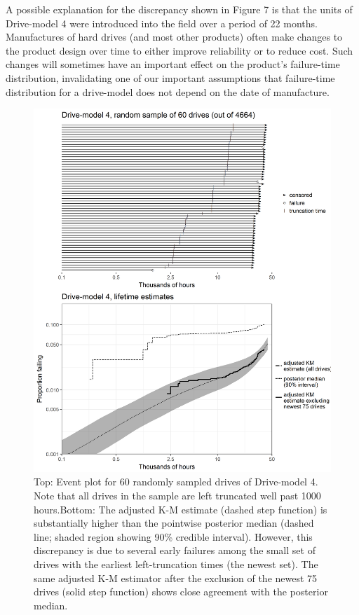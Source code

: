 \documentclass[12pt]{article}
\begin{document}
A possible explanation for the discrepancy shown in Figure 7 is that
the units of Drive-model 4 were introduced into the field over a
period of 22 months. Manufactures of hard drives (and most other
products) often make changes to the product design over time to
either improve reliability or to reduce cost. Such changes will
sometimes have an important effect on the product's failure-time
distribution, invalidating one of our important assumptions that
failure-time distribution for a drive-model does not depend on the
date of manufacture. 

\begin{figure}
\centering
\includegraphics[height=.8\textheight]{dm4-exception.png}
\caption{\footnotesize Top: Event plot for 60 randomly sampled drives of Drive-model 4. Note that all drives in the sample are left truncated well past 1000 hours.\hspace{\textwidth}Bottom: The adjusted K-M estimate (dashed step function) is substantially higher than the pointwise posterior median (dashed line; shaded region showing 90\% credible interval). However, this discrepancy is due to several early failures among the small set of drives with the earliest left-truncation times (the newest set). The same adjusted K-M estimator after the exclusion of the newest 75 drives (solid step function) shows close agreement with the posterior median.}

\label{fig:ex-mod-4}
\end{figure}
\end{document}
